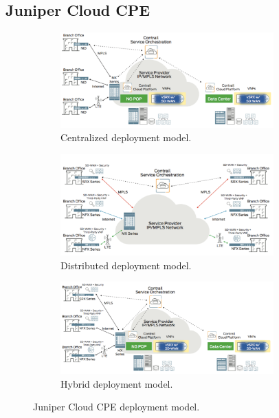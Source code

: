 \subsection{Juniper Cloud CPE}
\begin{figure}[!tp]
  \centering
  \begin{subfigure}[b]{\textwidth}
    \centering
    \includegraphics[width=0.9\textwidth]{./fig/juniper_central.png}
    \caption{Centralized deployment model.}
    \label{fig:juniper_central}
  \end{subfigure}
  \hfill
  \begin{subfigure}[b]{\textwidth}
    \centering
    \includegraphics[width=0.9\textwidth]{./fig/juniper_distributed.png}
    \caption{Distributed deployment model.}
    \label{fig:juniper_distributed}
  \end{subfigure}
  \hfill
  \begin{subfigure}[b]{\textwidth}
    \centering
    \includegraphics[width=0.9\textwidth]{./fig/juniper_hybrid.png}
    \caption{Hybrid deployment model.}
    \label{fig:juniper_hybrid}
  \end{subfigure}
  \caption{Juniper Cloud CPE deployment model. \cite{juniper-cpe}}
  \label{fig:juniper-cpe}
\end{figure}

